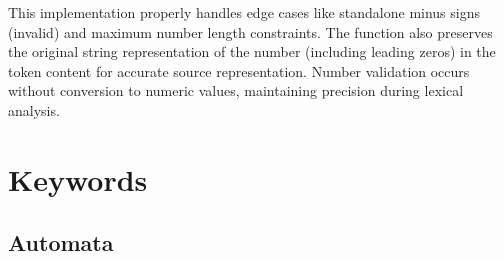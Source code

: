 \documentclass[12pt, a4paper]{report}
\begin{document}
This implementation properly handles edge cases like standalone minus signs (invalid) and maximum number length constraints. The function also preserves the original string representation of the number (including leading zeros) in the token content for accurate source representation. Number validation occurs without conversion to numeric values, maintaining precision during lexical analysis.

\section{Keywords}

\subsection{Automata}
\end{document}
